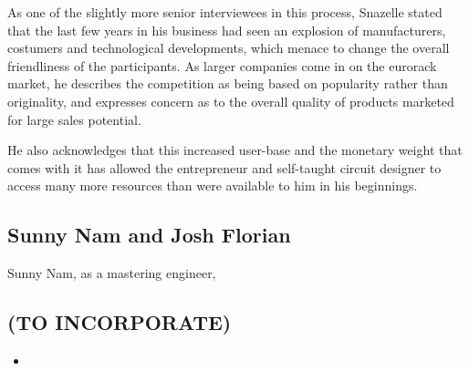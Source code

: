As one of the slightly more senior interviewees in this process, Snazelle stated that the last few years in his business had seen an explosion of manufacturers, costumers and technological developments, which menace to change the overall friendliness of the participants. As larger companies come in on the eurorack market, he describes the competition as being based on popularity rather than originality, and expresses concern as to the overall quality of products marketed for large sales potential. 

He also acknowledges that this increased user-base and the monetary weight that comes with it has allowed the entrepreneur and self-taught circuit designer to access many more resources than were available to him in his beginnings. 

%
\subsection{Sunny Nam and Josh Florian}

Sunny Nam, as a mastering engineer, 

%
%
%

\begin{unsortedStuff}	
\section*{(TO INCORPORATE)}
	\begin{itemize}
		\item 
	\end{itemize}
\end{unsortedStuff}
		
\begin{optBlankSpace}
	\newpage
	\mbox{}
\end{optBlankSpace}

